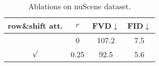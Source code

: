 \begin{table}[h]
    \centering

    \begin{tabular}{cc|cc}
    \toprule
    row\&shift att. & $r$ & \textbf{FVD$\downarrow$} & \textbf{FID$\downarrow$} \\
    \midrule
     & 0 & 107.2 & 7.5 \\
    \midrule
     $\surd$ & 0.25 & 92.5 & 5.6 \\

    \bottomrule
    \end{tabular}

    \caption{Ablations on nuScene dataset. }
    \label{tab:supp_abl_ns}
\end{table}